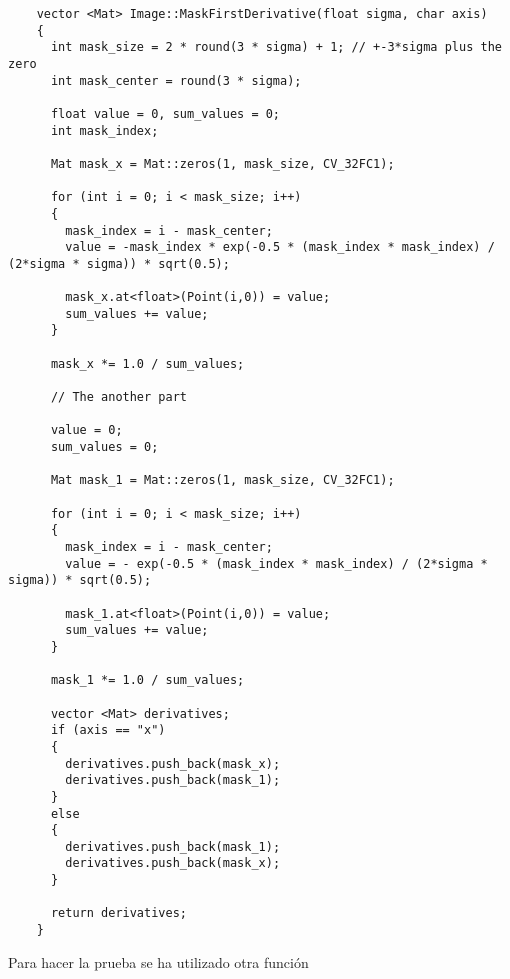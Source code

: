 \documentclass[a4paper, 11pt]{article}
\theoremstyle{definition}
\begin{document}
  \begin{lstlisting}
    vector <Mat> Image::MaskFirstDerivative(float sigma, char axis)
    {
      int mask_size = 2 * round(3 * sigma) + 1; // +-3*sigma plus the zero
      int mask_center = round(3 * sigma);

      float value = 0, sum_values = 0;
      int mask_index;

      Mat mask_x = Mat::zeros(1, mask_size, CV_32FC1);

      for (int i = 0; i < mask_size; i++)
      {
        mask_index = i - mask_center;
        value = -mask_index * exp(-0.5 * (mask_index * mask_index) / (2*sigma * sigma)) * sqrt(0.5);

        mask_x.at<float>(Point(i,0)) = value;
        sum_values += value;
      }

      mask_x *= 1.0 / sum_values;

      // The another part

      value = 0;
      sum_values = 0;

      Mat mask_1 = Mat::zeros(1, mask_size, CV_32FC1);

      for (int i = 0; i < mask_size; i++)
      {
        mask_index = i - mask_center;
        value = - exp(-0.5 * (mask_index * mask_index) / (2*sigma * sigma)) * sqrt(0.5);

        mask_1.at<float>(Point(i,0)) = value;
        sum_values += value;
      }

      mask_1 *= 1.0 / sum_values;

      vector <Mat> derivatives;
      if (axis == "x")
      {
        derivatives.push_back(mask_x);
        derivatives.push_back(mask_1);
      }
      else
      {
        derivatives.push_back(mask_1);
        derivatives.push_back(mask_x);
      }

      return derivatives;
    }
  \end{lstlisting}

  Para hacer la prueba se ha utilizado otra función
\end{document}
